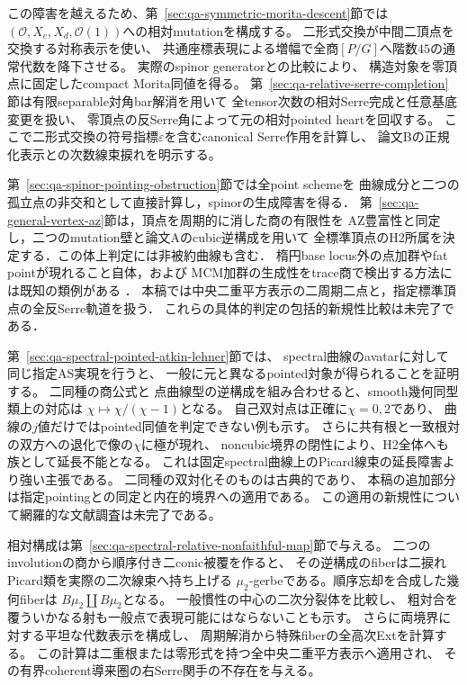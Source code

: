 \documentclass[a4paper,11pt]{ltjsarticle}
\numberwithin{equation}{section}
\theoremstyle{plain}
\theoremstyle{definition}
\theoremstyle{remark}
\begin{document}
この障害を越えるため、第~\ref{sec:qa-symmetric-morita-descent}節では
$(\mathcal O,X_c,X_d,\mathcal O(1))$への相対mutationを構成する。
二形式交換が中間二頂点を交換する対称表示を使い、
共通座標表現による増幅で全商$[P/G]$へ階数$45$の通常代数を降下させる。
実際のspinor generatorとの比較により、
構造対象を零頂点に固定したcompact Morita同値を得る。
第~\ref{sec:qa-relative-serre-completion}節は有限separable対角bar解消を用いて
全tensor次数の相対Serre完成と任意基底変更を扱い、
零頂点の反Serre角によって元の相対pointed heartを回収する。
ここで二形式交換の符号指標$\varepsilon$を含むcanonical Serre作用を計算し、
論文Bの正規化表示との次数線束捩れを明示する。

第~\ref{sec:qa-spinor-pointing-obstruction}節では全point schemeを
曲線成分と二つの孤立点の非交和として直接計算し，spinorの生成障害を得る．
第~\ref{sec:qa-general-vertex-az}節は，頂点を周期的に消した商の有限性を
AZ豊富性と同定し，二つのmutation壁と論文Aのcubic逆構成を用いて
全標準頂点のH2所属を決定する．この体上判定には非被約曲線も含む．
楕円base locus外の点加群やfat pointが現れること自体，および
MCM加群の生成性をtrace商で検出する方法には既知の類例がある
\cite[\S10.5]{SVdB2013}\cite[Lemma~6.6 and proof of Proposition~6.10]{RogalskiSierraStafford2020}．
本稿では中央二重平方表示の二周期二点と，指定標準頂点の全反Serre軌道を扱う．
これらの具体的判定の包括的新規性比較は未完了である．

第~\ref{sec:qa-spectral-pointed-atkin-lehner}節では、
spectral曲線のavatarに対して同じ指定AS実現を行うと、
一般に元と異なるpointed対象が得られることを証明する。
二同種の商公式\cite[III, Example~4.5]{SilvermanAEC2009}と
点曲線型の逆構成を組み合わせると、smooth幾何同型類上の対応は
$\chi\mapsto\chi/(\chi-1)$となる。
自己双対点は正確に$\chi=0,2$であり、
曲線の$j$値だけではpointed同値を判定できない例も示す。
さらに共有根と一致根対の双方への退化で像の$\chi$に極が現れ、
noncubic境界の閉性により、H2全体へも族として延長不能となる。
これは固定spectral曲線上のPicard線束の延長障害より強い主張である。
二同種の双対化そのものは古典的であり、
本稿の追加部分は指定pointingとの同定と内在的境界への適用である。
この適用の新規性について網羅的な文献調査は未完了である。

相対構成は第~\ref{sec:qa-spectral-relative-nonfaithful-map}節で与える。
二つのinvolutionの商から順序付き二conic被覆を作ると、
その逆構成のfiberは二捩れPicard類を実際の二次線束へ持ち上げる
$\mu_2$-gerbeである。順序忘却を合成した幾何fiberは
$B\mu_2\amalg B\mu_2$となる。
一般慣性の中心の二次分裂体を比較し、
粗対合を覆ういかなる射も一般点で表現可能にはならないことも示す。
さらに両境界に対する平坦な代数表示を構成し、
周期解消から特殊fiberの全高次Extを計算する。
この計算は二重根または零形式を持つ全中央二重平方表示へ適用され、
その有界coherent導来圏の右Serre関手の不存在を与える。
\end{document}
